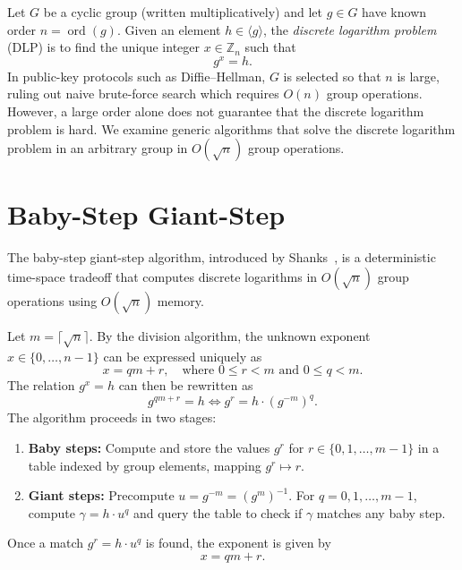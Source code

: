 
Let \(G\) be a cyclic group (written multiplicatively) and let \(g \in G\) have known order \(n = \operatorname{ord}(g)\).
Given an element \(h \in \langle g \rangle\), the \emph{discrete logarithm problem} (DLP) is to find the unique integer \(x \in \mathbb{Z}_n\) such that
\[
    g^x = h.
\]
In public-key protocols such as Diffie--Hellman, \(G\) is selected so that \(n\) is large, ruling out naive brute-force search which requires \(O(n)\) group operations.
However, a large order alone does not guarantee that the discrete logarithm problem is hard.
We examine generic algorithms that solve the discrete logarithm problem in an arbitrary group in \(O(\sqrt{n})\) group operations.

\section*{Baby-Step Giant-Step}

The baby-step giant-step algorithm, introduced by Shanks~\cite{Shanks1971}, is a deterministic time-space tradeoff that computes discrete logarithms in \(O(\sqrt{n})\) group operations using \(O(\sqrt{n})\) memory.

Let \(m = \lceil \sqrt{n} \rceil\).
By the division algorithm, the unknown exponent \(x \in \{0, \dots, n-1\}\) can be expressed uniquely as
\[
    x = qm + r, \quad \text{where } 0 \leq r < m \text{ and } 0 \leq q < m.
\]
The relation \(g^x = h\) can then be rewritten as
\[
    g^{qm + r} = h \iff g^r = h \cdot (g^{-m})^q.
\]
The algorithm proceeds in two stages:
\begin{enumerate}
    \item \textbf{Baby steps:} Compute and store the values \(g^r\) for \(r \in \{0, 1, \dots, m-1\}\) in a table indexed by group elements, mapping \(g^r \mapsto r\).
    \item \textbf{Giant steps:} Precompute \(u = g^{-m} = (g^m)^{-1}\). For \(q = 0, 1, \dots, m-1\), compute \(\gamma = h \cdot u^q\) and query the table to check if \(\gamma\) matches any baby step.
\end{enumerate}
Once a match \(g^r = h \cdot u^q\) is found, the exponent is given by
\[
    x = qm + r.
\]

